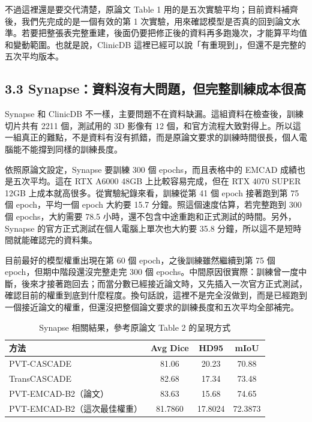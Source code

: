 \documentclass[a4paper,12pt,twocolumn]{article}
\begin{document}
不過這裡還是要交代清楚，原論文 Table 1 用的是五次實驗平均；目前資料補齊後，我們先完成的是一個有效的第 1 次實驗，用來確認模型是否真的回到論文水準。若要把整張表完整重建，後面仍要把修正後的資料再多跑幾次，才能算平均值和變動範圍。也就是說，ClinicDB 這裡已經可以說「有重現到」，但還不是完整的五次平均版本。

\subsection*{3.3 Synapse：資料沒有大問題，但完整訓練成本很高}
Synapse 和 ClinicDB 不一樣，主要問題不在資料缺漏。這組資料在檢查後，訓練切片共有 2211 個，測試用的 3D 影像有 12 個，和官方流程大致對得上。所以這一組真正的難點，不是資料有沒有抓錯，而是原論文要求的訓練時間很長，個人電腦能不能撐到同樣的訓練長度。

依照原論文設定，Synapse 要訓練 300 個 epochs，而且表格中的 EMCAD 成績也是五次平均。這在 RTX A6000 48GB 上比較容易完成，但在 RTX 4070 SUPER 12GB 上成本就高很多。從實驗紀錄來看，訓練從第 41 個 epoch 接著跑到第 75 個 epoch，平均一個 epoch 大約要 15.7 分鐘。照這個速度估算，若完整跑到 300 個 epochs，大約需要 78.5 小時，還不包含中途重跑和正式測試的時間。另外，Synapse 的官方正式測試在個人電腦上單次也大約要 35.8 分鐘，所以這不是短時間就能確認完的資料集。

目前最好的模型權重出現在第 60 個 epoch，之後訓練雖然繼續到第 75 個 epoch，但期中階段還沒完整走完 300 個 epochs。中間原因很實際：訓練曾一度中斷，後來才接著跑回去；而當分數已經接近論文時，又先插入一次官方正式測試，確認目前的權重到底到什麼程度。換句話說，這裡不是完全沒做到，而是已經跑到一個接近論文的權重，但還沒把整個論文要求的訓練長度和五次平均全部補完。

\begin{table}[t]
\centering
\caption{Synapse 相關結果，參考原論文 Table 2 的呈現方式}
\scriptsize
\setlength{\tabcolsep}{9pt}
\renewcommand{\arraystretch}{1.18}
\begin{tabular}{l c c c}
\toprule
\textbf{方法} & \textbf{Avg Dice} & \textbf{HD95} & \textbf{mIoU} \\
\midrule
PVT-CASCADE & 81.06 & 20.23 & 70.88 \\
TransCASCADE & 82.68 & 17.34 & 73.48 \\
PVT-EMCAD-B2（論文） & 83.63 & 15.68 & 74.65 \\
PVT-EMCAD-B2（這次最佳權重） & 81.7860 & 17.8024 & 72.3873 \\
\bottomrule
\end{tabular}
\end{table}
\end{document}
